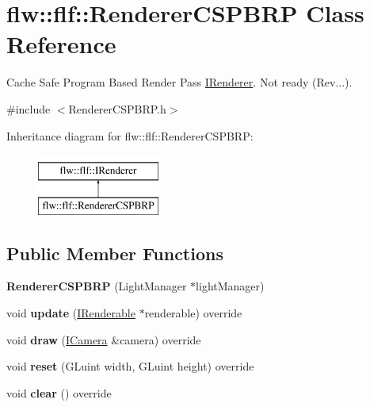 \hypertarget{classflw_1_1flf_1_1RendererCSPBRP}{}\section{flw\+:\+:flf\+:\+:Renderer\+C\+S\+P\+B\+RP Class Reference}
\label{classflw_1_1flf_1_1RendererCSPBRP}


Cache Safe Program Based Render Pass \hyperlink{classflw_1_1flf_1_1IRenderer}{I\+Renderer}. Not ready (Rev...).  




{\ttfamily \#include $<$Renderer\+C\+S\+P\+B\+R\+P.\+h$>$}

Inheritance diagram for flw\+:\+:flf\+:\+:Renderer\+C\+S\+P\+B\+RP\+:\begin{figure}[H]
\begin{center}
\leavevmode
\includegraphics[height=2.000000cm]{classflw_1_1flf_1_1RendererCSPBRP}
\end{center}
\end{figure}
\subsection*{Public Member Functions}
\begin{DoxyCompactItemize}
\item 
{\bfseries Renderer\+C\+S\+P\+B\+RP} (Light\+Manager $\ast$light\+Manager)\hypertarget{classflw_1_1flf_1_1RendererCSPBRP_a97d929f472e8e5c32f5cb05b781af168}{}\label{classflw_1_1flf_1_1RendererCSPBRP_a97d929f472e8e5c32f5cb05b781af168}

\item 
void {\bfseries update} (\hyperlink{classflw_1_1flf_1_1IRenderable}{I\+Renderable} $\ast$renderable) override\hypertarget{classflw_1_1flf_1_1RendererCSPBRP_a3048d852936497f66a5e52ee6da6a7b4}{}\label{classflw_1_1flf_1_1RendererCSPBRP_a3048d852936497f66a5e52ee6da6a7b4}

\item 
void {\bfseries draw} (\hyperlink{classflw_1_1flf_1_1ICamera}{I\+Camera} \&camera) override\hypertarget{classflw_1_1flf_1_1RendererCSPBRP_a8c314e85ecfeeafcb42d0b2802a3db28}{}\label{classflw_1_1flf_1_1RendererCSPBRP_a8c314e85ecfeeafcb42d0b2802a3db28}

\item 
void {\bfseries reset} (G\+Luint width, G\+Luint height) override\hypertarget{classflw_1_1flf_1_1RendererCSPBRP_a6fd6850e484a880e4c77ac41b59fbddc}{}\label{classflw_1_1flf_1_1RendererCSPBRP_a6fd6850e484a880e4c77ac41b59fbddc}

\item 
void {\bfseries clear} () override\hypertarget{classflw_1_1flf_1_1RendererCSPBRP_acc196eb44bcdb541a360f60d4e9ce7db}{}\label{classflw_1_1flf_1_1RendererCSPBRP_acc196eb44bcdb541a360f60d4e9ce7db}

\end{DoxyCompactItemize}

